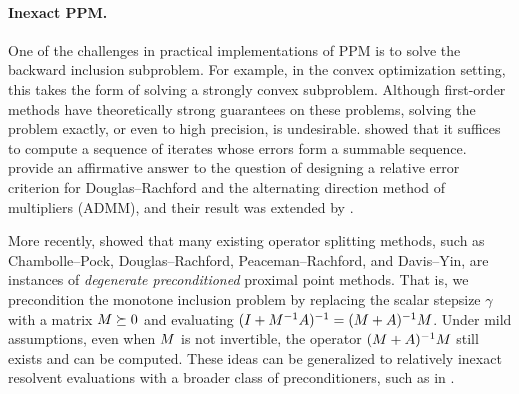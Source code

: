 \documentclass[11pt]{article}
\begin{document}
\paragraph{Inexact PPM.}
One of the challenges in practical implementations of PPM is to solve the backward inclusion subproblem.
For example, in the convex optimization setting, this takes the form of solving a strongly convex subproblem.
Although first-order methods have theoretically strong guarantees on these problems, solving the problem exactly, or even to high precision, is undesirable.
\citet{rockafellar-ppm-paper} showed that it suffices to compute a sequence of iterates whose errors form a summable sequence.
\citet{EcksteinRelativeError2018} provide an affirmative answer to the question of designing a relative error criterion for Douglas--Rachford and the alternating direction method of multipliers (ADMM), and their result was extended by \citet{svaiter2018weaklyconvergentfullyinexact,BarrePEPInexactMethods}.

More recently, \citet{bredies2021degeneratepreconditionedproximalpoint} showed that many existing operator splitting methods, such as Chambolle--Pock, Douglas--Rachford, Peaceman--Rachford, and Davis--Yin, are instances of \emph{degenerate preconditioned} proximal point methods.
That is, we precondition the monotone inclusion problem  by replacing the scalar stepsize $\gamma$ with a matrix $ {M} \succeq 0$ and evaluating $(I +  {M} ^{-1}{A})^{-1} = ( {M}  + {A})^{-1} {M} $.
Under mild assumptions, even when $ {M} $ is not invertible, the operator $( {M}  + {A})^{-1} {M} $ still exists and can be computed.
These ideas can be generalized to relatively inexact resolvent evaluations with a broader class of preconditioners, such as in \citet{alves2025generalframeworkinexactsplitting}.
\end{document}
